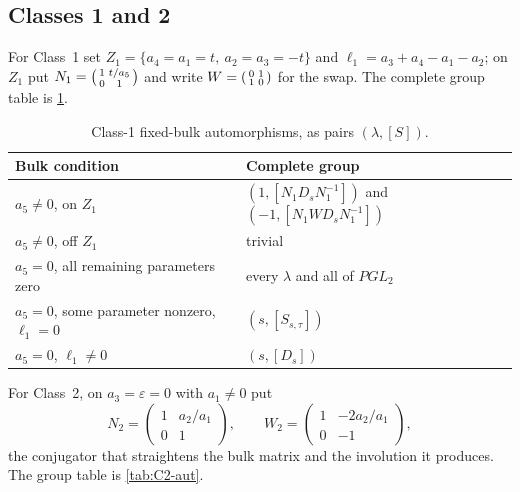 \documentclass[11pt,reqno]{amsart}
\theoremstyle{plain}
\theoremstyle{definition}
\theoremstyle{remark}
\numberwithin{equation}{section}
\begin{document}
\subsection{Classes 1 and 2}

For Class~1 set $Z_1=\{a_4=a_1=t,\ a_2=a_3=-t\}$ and
$\ell_1=a_3+a_4-a_1-a_2$; on $Z_1$ put
$N_1=\begin{psmallmatrix}1&t/a_5\\0&1\end{psmallmatrix}$ and write
$W=\begin{psmallmatrix}0&1\\1&0\end{psmallmatrix}$ for the swap. The complete
group table is \cref{tab:C1-aut}.

\begin{table}[t]
\centering\footnotesize
\caption{Class-1 fixed-bulk automorphisms, as pairs $(\lambda,[S])$.}
\label{tab:C1-aut}
\begin{tabularx}{\textwidth}{>{\RaggedRight\arraybackslash}X >{\RaggedRight\arraybackslash}X}
\toprule
Bulk condition & Complete group \\
\midrule
$a_5\ne0$, on $Z_1$ &
$(1,[N_1D_sN_1^{-1}])$ and $(-1,[N_1WD_sN_1^{-1}])$ \\
$a_5\ne0$, off $Z_1$ & trivial \\
$a_5=0$, all remaining parameters zero & every $\lambda$ and all of $PGL_2$ \\
$a_5=0$, some parameter nonzero, $\ell_1=0$ & $(s,[S_{s,\tau}])$ \\
$a_5=0$, $\ell_1\ne0$ & $(s,[D_s])$ \\
\bottomrule
\end{tabularx}
\end{table}

For Class~2, on $a_3=\varepsilon=0$ with $a_1\ne0$ put
\begin{equation}
N_2=\begin{pmatrix}1&a_2/a_1\\0&1\end{pmatrix},\qquad
W_2=\begin{pmatrix}1&-2a_2/a_1\\0&-1\end{pmatrix},
\label{eq:C2-conjugators}
\end{equation}
the conjugator that straightens the bulk matrix and the involution it produces.
The group table is \cref{tab:C2-aut}.
\end{document}
